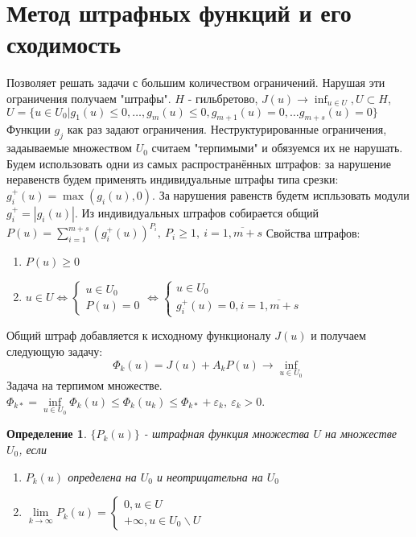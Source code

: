 \documentclass[9pt, a4paper]{extarticle}
\newtheorem*{definition}{Определение}
\begin{document}
\section{Метод штрафных функций и его сходимость}
	Позволяет решать задачи с большим количеством ограничений. Нарушая эти ограничения получаем "штрафы". \newline
	$H$ - гильбретово, $J(u) \to \inf_{u\in U}, U\subset H$, $U = \{u \in U_0 \vert g_1(u) \leq 0, \dots, g_m(u) \leq 0, g_{m+1}(u) =0, \dots g_{m+s}(u) = 0\}$ Функции $g_j$ как раз задают ограничения. Неструктурированные ограничения, задаываемые множеством $U_0$ считаем "терпимыми" и обязуемся их не нарушать. \newline
	Будем использовать одни из самых распространённых штрафов: за нарушение неравенств будем применять индивидуальные штрафы типа срезки: $g_i^+ (u) = \max{(g_i(u), 0)}$. За нарушения равенств будетм испльзовать модули $g_i^+ = |g_i(u)|$. Из индивидуальных штрафов собирается общий $P(u) = \sum\limits_{i=1}^{m+s} (g_i^+(u))^{P_i}, \ P_i \geq 1, \ i =\overline{1, m+s}$\newline
	Свойства штрафов:
	\begin{enumerate}
		\item $P(u) \geq 0$
		\item $u\in U \Leftrightarrow \begin{cases} u\in U_0 \\ P(u) = 0 \end{cases} \Leftrightarrow \begin{cases} u\in U_0 \\ g_i^+(u) = 0 , i = \overline{1, m+s}\end{cases}$
		
	\end{enumerate}
	Общий штраф добавляется к исходному функционалу $J(u)$ и получаем следующую задачу: 
	\begin{equation*}
		\Phi_k(u) = J(u) + A_kP(u) \to \inf_{u \in U_0}
	\end{equation*}
	Задача на терпимом множестве. $\Phi_{k*} = \inf\limits_{u\in U_0} \Phi_k(u) \leq \Phi_k(u_k) \leq \Phi_{k*} + \varepsilon_k, \ \varepsilon_k > 0$. 
	\begin{definition}
		$\{P_k(u)\}$ - штрафная функция множества $U$ на множестве $U_0$, если
		\begin{enumerate}
			\item $P_k(u)$ определена на $U_0$ и неотрицательна на $U_0$
			\item $\lim\limits_{k\to\infty} P_k(u) = \begin{cases}
				0, u\in U\\
				+\infty, u \in U_0 \backslash U
			\end{cases}$
		\end{enumerate}
	\end{definition}
	
\end{document}
